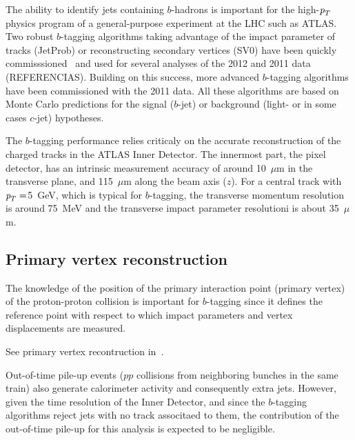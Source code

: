 \begin{itemize}

The ability to identify jets containing $b$-hadrons is important for the high-${\emph{p}_{T}}$ physics program of a general-purpose experiment at the LHC such as ATLAS. Two robust $b$-tagging algorithms taking advantage of the impact parameter of tracks (JetProb) or reconstructing secondary vertices (SV0) have been quickly commisssioned~\cite{ATLAS-CONF-2010-091}\cite{ATLAS-CONF-2010-042} and used for several analyses of the 2012 and 2011 data (REFERENCIAS).
Building on this success, more advanced $b$-tagging algorithms have been commissioned with the 2011 data. All these algorithms are based on Monte Carlo predictions for the signal ($b$-jet) or background (light- or in some cases $c$-jet) hypotheses.

The $b$-tagging performance relies criticaly on the accurate reconstruction of the charged tracks in the ATLAS Inner Detector. 
The innermost part, the pixel detector, has an intrinsic measurement accuracy of around 10~$\mu$m in the transverse plane, and 115~$\mu$m along the beam axis ($z$).  For a central track with ${\emph{p}_{T}}=$5~GeV, which is typical for $b$-tagging, the transverse momentum resolution is around 75~MeV and the transverse impact parameter resolutioni is about 35~$\mu$m.

\subsection{Primary vertex reconstruction}

The knowledge of the position of the primary interaction point (primary vertex) of the proton-proton collision is important for $b$-tagging since it defines the reference point with respect to which impact parameters and vertex displacements are measured.

See primary vertex recontruction in~\cite{ATLAS-CONF-2010-069}.


Out-of-time pile-up events ($pp$ collisions from neighboring bunches in the same train) also generate calorimeter activity and consequently extra jets. However, given the time resolution of the Inner Detector, and since the $b$-tagging algorithms reject jets with no track associtaed to them, the contribution of the out-of-time pile-up for this analysis is expected to be negligible.





\end{itemize}
